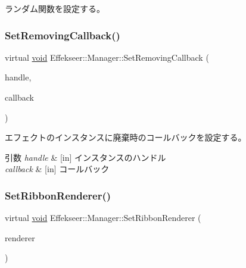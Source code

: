 ランダム関数を設定する。 

\mbox{\label{class_effekseer_1_1_manager_a62c24747994008dfcb84a0adcd53b3ad}} 
\subsubsection{\texorpdfstring{Set\+Removing\+Callback()}{SetRemovingCallback()}}
{\footnotesize\ttfamily virtual \mbox{\hyperlink{namespace_effekseer_ab34c4088e512200cf4c2716f168deb56}{void}} Effekseer\+::\+Manager\+::\+Set\+Removing\+Callback (\begin{DoxyParamCaption}\item[{\mbox{\hyperlink{namespace_effekseer_afba58b8d812da862190e9bbfc040824a}{Handle}}}]{handle,  }\item[{Effect\+Instance\+Removing\+Callback}]{callback }\end{DoxyParamCaption})\hspace{0.3cm}{\ttfamily [pure virtual]}}



エフェクトのインスタンスに廃棄時のコールバックを設定する。 


\begin{DoxyParams}{引数}
{\em handle} & \mbox{[}in\mbox{]} インスタンスのハンドル \\
\hline
{\em callback} & \mbox{[}in\mbox{]} コールバック \\
\hline
\end{DoxyParams}
\mbox{\label{class_effekseer_1_1_manager_afe6fa26d93c9c80a0afb8f4fbe0afe20}} 
\subsubsection{\texorpdfstring{Set\+Ribbon\+Renderer()}{SetRibbonRenderer()}}
{\footnotesize\ttfamily virtual \mbox{\hyperlink{namespace_effekseer_ab34c4088e512200cf4c2716f168deb56}{void}} Effekseer\+::\+Manager\+::\+Set\+Ribbon\+Renderer (\begin{DoxyParamCaption}\item[{\mbox{\hyperlink{class_effekseer_1_1_ribbon_renderer}{Ribbon\+Renderer}} $\ast$}]{renderer }\end{DoxyParamCaption})\hspace{0.3cm}{\ttfamily [pure virtual]}}



